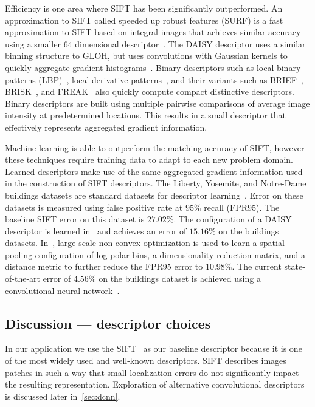         Efficiency is one area where SIFT has been significantly outperformed.
        An approximation to SIFT called speeded up robust features (SURF) is a fast approximation to SIFT
          based on integral images that achieves similar accuracy using a smaller $64$ dimensional
          descriptor~\cite{bay_surf_2006}.
        The DAISY descriptor uses a similar binning structure to GLOH, but uses convolutions with Gaussian
          kernels to quickly aggregate gradient histograms~\cite{tola_fast_2008}.
        Binary descriptors such as local binary patterns (LBP)~\cite{ojala_comparative_1996, zhang_local_2010},
          local derivative patterns~\cite{heikkila_description_2009}, and their variants such as
          BRIEF~\cite{calonder_brief_2010}, BRISK~\cite{leutenegger_brisk_2011}, and FREAK~\cite{alahi_freak_2012}
          also quickly compute compact distinctive descriptors.
        Binary descriptors are built using multiple pairwise comparisons of average image intensity at
          predetermined locations.
        This results in a small descriptor that effectively represents aggregated gradient information.

        Machine learning is able to outperform the matching accuracy of SIFT, however these techniques require
        training data to adapt to each new problem domain. Learned descriptors make use of the same aggregated
        gradient information used in the construction of SIFT descriptors. The Liberty, Yosemite, and Notre-Dame
        buildings datasets are standard datasets for descriptor learning~\cite{brown_discriminative_2011}. Error on
        these datasets is measured using false positive rate at $95\percent$ recall (FPR95). The baseline SIFT
        error on this dataset is $27.02\percent$. The configuration of a DAISY descriptor is learned
        in~\cite{winder_picking_2009} and achieves an error of $15.16\percent$ on the buildings datasets.
        In~\cite{simonyan_learning_2014}, large scale non-convex optimization is used to learn a spatial pooling
        configuration of log-polar bins, a dimensionality reduction matrix, and a distance metric to further reduce
        the FPR95 error to $10.98\percent$. The current state-of-the-art error of $4.56\percent$ on the buildings
        dataset is achieved using a convolutional neural network~\cite{zagoruyko_learning_2015}.

    \subsection{Discussion --- descriptor choices}
        In our application we use the SIFT~\cite{lowe_distinctive_2004} as our
        baseline descriptor because it is one of the most widely used and well-known descriptors. SIFT describes
        images patches in such a way that small localization errors do not significantly impact the resulting
        representation. Exploration of alternative convolutional descriptors is discussed later in~\cref{sec:dcnn}.


